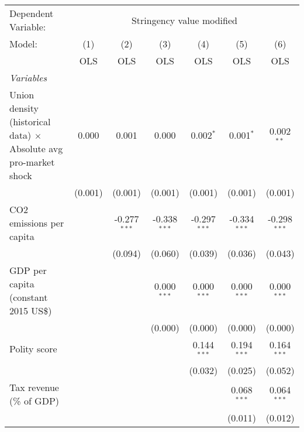 
\begingroup
\centering
\begin{tabular}{lcccccc}
   \toprule
   Dependent Variable: & \multicolumn{6}{c}{Stringency value modified}\\
   Model:                                                                  & (1)     & (2)            & (3)            & (4)            & (5)            & (6)\\  
                                                                           &  OLS    & OLS            & OLS            & OLS            & OLS            & OLS\\  
   \midrule
   \emph{Variables}\\
   Union density (historical data) $\times$ Absolute avg pro-market shock  & 0.000   & 0.001          & 0.000          & 0.002$^{*}$    & 0.001$^{*}$    & 0.002$^{**}$\\   
                                                                           & (0.001) & (0.001)        & (0.001)        & (0.001)        & (0.001)        & (0.001)\\   
   CO2 emissions per capita                                                &         & -0.277$^{***}$ & -0.338$^{***}$ & -0.297$^{***}$ & -0.334$^{***}$ & -0.298$^{***}$\\   
                                                                           &         & (0.094)        & (0.060)        & (0.039)        & (0.036)        & (0.043)\\   
   GDP per capita (constant 2015 US\$)                                     &         &                & 0.000$^{***}$  & 0.000$^{***}$  & 0.000$^{***}$  & 0.000$^{***}$\\   
                                                                           &         &                & (0.000)        & (0.000)        & (0.000)        & (0.000)\\   
   Polity score                                                            &         &                &                & 0.144$^{***}$  & 0.194$^{***}$  & 0.164$^{***}$\\   
                                                                           &         &                &                & (0.032)        & (0.025)        & (0.052)\\   
   Tax revenue (\% of GDP)                                                 &         &                &                &                & 0.068$^{***}$  & 0.064$^{***}$\\   
                                                                           &         &                &                &                & (0.011)        & (0.012)\\   

\end{tabular}

